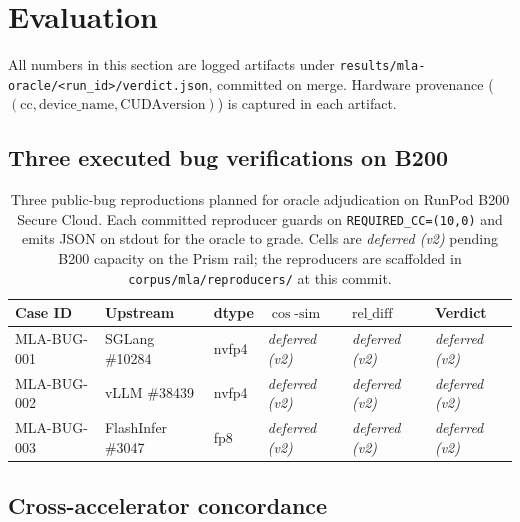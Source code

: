 \documentclass[11pt]{article}
\begin{document}
\section{Evaluation}
\label{sec:eval}

All numbers in this section are logged artifacts under
\texttt{results/mla-oracle/\textless run\_id\textgreater/verdict.json},
committed on merge. Hardware provenance ($(\mathrm{cc}, \mathrm{device\_name}, \mathrm{CUDA version})$)
is captured in each artifact.

\subsection{Three executed bug verifications on B200}
\label{sec:eval-bugs}

\begin{table}[htbp]
\centering
\caption{Three public-bug reproductions planned for oracle
adjudication on RunPod B200 Secure Cloud. Each committed reproducer
guards on \texttt{REQUIRED\_CC=(10,0)} and emits JSON on stdout for
the oracle to grade. Cells are \textit{deferred (v2)} pending B200
capacity on the Prism rail; the reproducers are scaffolded in
\texttt{corpus/mla/reproducers/} at this commit.}
\label{tab:bugs}
\begin{tabular}{llllll}
\toprule
Case ID & Upstream & dtype & $\cos\text{-}\mathrm{sim}$ & $\mathrm{rel\_diff}$ & Verdict \\
\midrule
MLA-BUG-001 & SGLang \#10284   & nvfp4 & \textit{deferred (v2)} & \textit{deferred (v2)} & \textit{deferred (v2)} \\
MLA-BUG-002 & vLLM \#38439     & nvfp4 & \textit{deferred (v2)} & \textit{deferred (v2)} & \textit{deferred (v2)} \\
MLA-BUG-003 & FlashInfer \#3047 & fp8  & \textit{deferred (v2)} & \textit{deferred (v2)} & \textit{deferred (v2)} \\
\bottomrule
\end{tabular}
\end{table}

\subsection{Cross-accelerator concordance}
\label{sec:eval-concordance}
\end{document}
